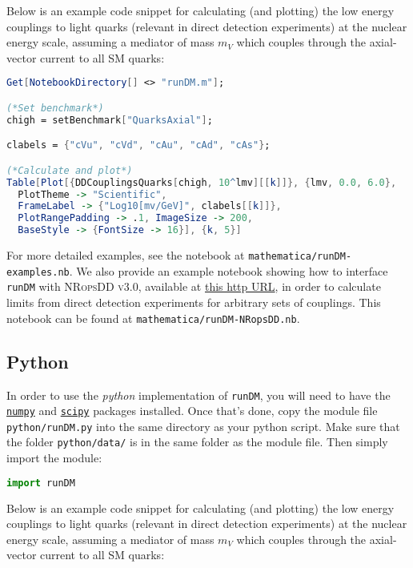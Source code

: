 \documentclass[notitlepage,12pt]{article}
\newcommand{\runDM}{\texttt{runDM}\xspace}
\begin{document}
Below is an example code snippet for calculating (and plotting) the low energy couplings to light quarks (relevant in direct detection experiments) at the nuclear energy scale, assuming a mediator of mass $m_V$ which couples through the axial-vector current to all SM quarks:

\begin{lstlisting}[language=mathematica]
Get[NotebookDirectory[] <> "runDM.m"];

(*Set benchmark*)
chigh = setBenchmark["QuarksAxial"];

clabels = {"cVu", "cVd", "cAu", "cAd", "cAs"};

(*Calculate and plot*)
Table[Plot[{DDCouplingsQuarks[chigh, 10^lmv][[k]]}, {lmv, 0.0, 6.0}, 
  PlotTheme -> "Scientific", 
  FrameLabel -> {"Log10[mv/GeV]", clabels[[k]]}, 
  PlotRangePadding -> .1, ImageSize -> 200, 
  BaseStyle -> {FontSize -> 16}], {k, 5}]
\end{lstlisting}
For more detailed examples, see the notebook at \texttt{mathematica/runDM-examples.nb}. We also provide an example notebook showing how to interface \runDM with \textsc{NRopsDD v3.0}, available at \href{http://www.marcocirelli.net/NROpsDD.html}{this http URL}, in order to calculate limits from direct detection experiments for arbitrary sets of couplings. This notebook can be found at \texttt{mathematica/runDM-NRopsDD.nb}.

\subsection{Python}

In order to use the \textit{python} implementation of \runDM, you will need to have the \href{http://www.numpy.org}{\texttt{numpy}} and \href{https://www.scipy.org/index.html}{\texttt{scipy}} packages installed.  Once that's done, copy the module file \texttt{python/runDM.py} into the same directory as your python script. Make sure that the folder \texttt{python/data/} is in the same folder as the module file. Then simply import the module:

\begin{lstlisting}[language=Python]
import runDM
\end{lstlisting}

Below is an example code snippet for calculating (and plotting) the low energy couplings to light quarks (relevant in direct detection experiments) at the nuclear energy scale, assuming a mediator of mass $m_V$ which couples through the axial-vector current to all SM quarks:
\end{document}
